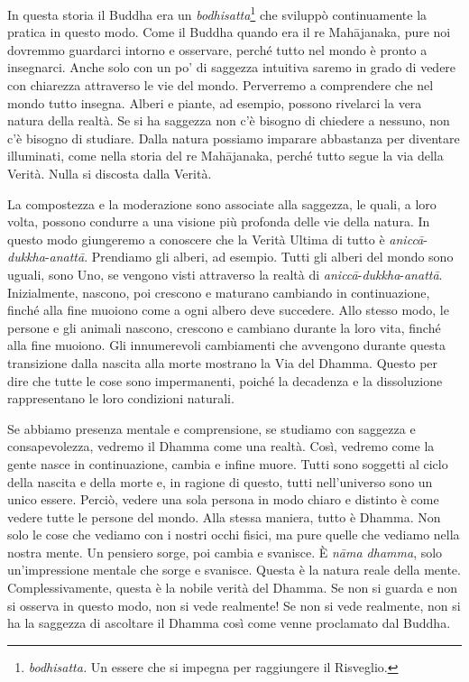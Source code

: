 In questa storia il Buddha era un \emph{bodhisatta}\footnote{\emph{bodhisatta.}
  Un essere che si impegna per raggiungere il Risveglio.} che sviluppò
continuamente la pratica in questo modo. Come il Buddha quando era il re
Mahājanaka, pure noi dovremmo guardarci intorno e osservare, perché
tutto nel mondo è pronto a insegnarci. Anche solo con un po' di saggezza
intuitiva saremo in grado di vedere con chiarezza attraverso le vie del
mondo. Perverremo a comprendere che nel mondo tutto insegna. Alberi e
piante, ad esempio, possono rivelarci la vera natura della realtà. Se si
ha saggezza non c'è bisogno di chiedere a nessuno, non c'è bisogno di
studiare. Dalla natura possiamo imparare abbastanza per diventare
illuminati, come nella storia del re Mahājanaka, perché tutto segue la
via della Verità. Nulla si discosta dalla Verità.

La compostezza e la moderazione sono associate alla saggezza, le quali,
a loro volta, possono condurre a una visione più profonda delle vie
della natura. In questo modo giungeremo a conoscere che la Verità Ultima
di tutto è \emph{aniccā}-\emph{dukkha}-\emph{anattā}. Prendiamo gli
alberi, ad esempio. Tutti gli alberi del mondo sono uguali, sono Uno, se
vengono visti attraverso la realtà di
\emph{aniccā}-\emph{dukkha}-\emph{anattā}. Inizialmente, nascono, poi
crescono e maturano cambiando in continuazione, finché alla fine muoiono
come a ogni albero deve succedere. Allo stesso modo, le persone e gli
animali nascono, crescono e cambiano durante la loro vita, finché alla
fine muoiono. Gli innumerevoli cambiamenti che avvengono durante questa
transizione dalla nascita alla morte mostrano la Via del Dhamma. Questo
per dire che tutte le cose sono impermanenti, poiché la decadenza e la
dissoluzione rappresentano le loro condizioni naturali.

Se abbiamo presenza mentale e comprensione, se studiamo con saggezza e
consapevolezza, vedremo il Dhamma come una realtà. Così, vedremo come la
gente nasce in continuazione, cambia e infine muore. Tutti sono soggetti
al ciclo della nascita e della morte e, in ragione di questo, tutti
nell'universo sono un unico essere. Perciò, vedere una sola persona in
modo chiaro e distinto è come vedere tutte le persone del mondo. Alla
stessa maniera, tutto è Dhamma. Non solo le cose che vediamo con i
nostri occhi fisici, ma pure quelle che vediamo nella nostra mente. Un
pensiero sorge, poi cambia e svanisce. È \emph{nāma dhamma}, solo
un'impressione mentale che sorge e svanisce. Questa è la natura reale
della mente. Complessivamente, questa è la nobile verità del Dhamma. Se
non si guarda e non si osserva in questo modo, non si vede realmente! Se
non si vede realmente, non si ha la saggezza di ascoltare il Dhamma così
come venne proclamato dal Buddha.

